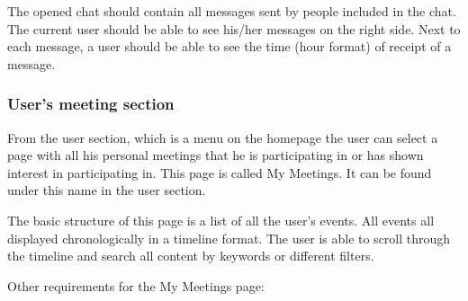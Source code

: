 \documentclass[conference]{IEEEtran}
\begin{document}
The opened chat should contain all messages sent by people included in the chat. The current user should be able to see his/her messages on the right side. Next to each message, a user should be able to see the time (hour format) of receipt of a message.

\subsubsection{User’s meeting section}

From the user section, which is a menu on the homepage
the user can select a page with all his personal meetings that he is participating in or has shown interest in participating in. This page is called My Meetings. It can be found under this name in the user section.

The basic structure of this page is a list of all the user’s events. All events all displayed chronologically in a timeline format. The user is able to scroll through the timeline and search all content by keywords or different filters.

Other requirements for the My Meetings page:
\end{document}
